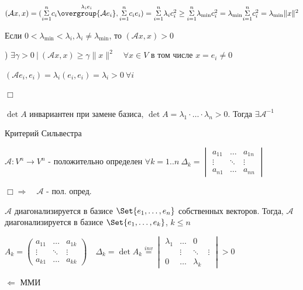 \documentclass[12pt]{article}
\begin{document}
    $(\mathcal{A}x, x) = (\overset{n}{\underset{i = 1}{\Sigma}} c_i \overset{\lambda_i e_i}{\overgroup{\mathcal{A}e_i}}, \overset{n}{\underset{i = 1}{\Sigma}} c_i e_i) =
    \overset{n}{\underset{i = 1}{\Sigma}} \lambda_i c_i^2 \geq \overset{n}{\underset{i = 1}{\Sigma}}\lambda_{\min} c_i^2 =
    \lambda_{\min} \overset{n}{\underset{i = 1}{\Sigma}}c_i^2 = \lambda_{\min} \|x\|^2$

    Если $0 < \lambda_{\min} < \lambda_i, \lambda_i \neq \lambda_{\min}$, то $(\mathcal{A}x, x) > 0$

    \Longleftarrow {}) \Longleftrightarrow $\exists \gamma > 0 \ | \ (\mathcal{A}x, x) \geq \gamma \|x\|^2 \quad \forall x \in V$ в том числе $x = e_i \neq 0$

    $(\mathcal{A}e_i, e_i) = \lambda_i (e_i, e_i) = \lambda_i > 0 \ \forall i$

    $\Box$

    \Nota $\det A$ инвариантен при замене базиса, $\det A = \lambda_1 \cdot \dots \cdot \lambda_n > 0$. Тогда $\exists \mathcal{A}^{-1}$

    \Th Критерий Сильвестра

    $\mathcal{A}: V^n \to V^n$ - положительно определен \Longleftrightarrow $\forall k = 1..n \ \Delta_k =
    \begin{vmatrix}a_{11} & \dots & a_{1n} \\ \vdots & \ddots & \vdots \\ a_{n1} & \dots & a_{nn}\end{vmatrix}$

    $\Box \Longrightarrow \quad \mathcal{A}$ - пол. опред.

    $\mathcal{A}$ диагонализируется в базисе $\Set{e_1, \dots, e_n}$ собственных векторов.
    Тогда, $\mathcal{A}$ диагонализируется в базисе $\Set{e_1, \dots, e_k}$, $k \leq n$

    $A_k = \begin{pmatrix}a_{11} & \dots & a_{1k} \\ \vdots & \ddots & \vdots \\ a_{k1} & \dots & a_{kk}\end{pmatrix} \quad
    \Delta_k = \det A_k \stackrel{inv}{=} \begin{vmatrix}\lambda_{1} & \dots & 0 \\ & \vdots & \ddots & \vdots \\ 0 & \dots & \lambda_{k}\end{vmatrix} > 0$

    $\Longleftarrow$ ММИ
\end{document}
